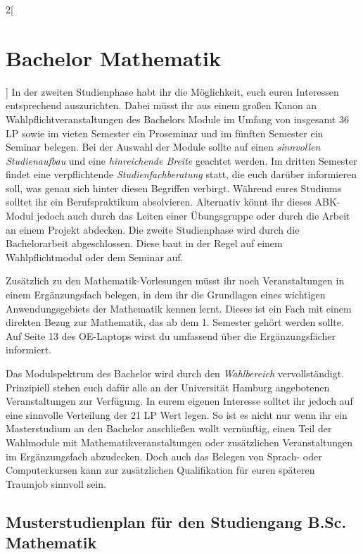 \begin{multicols}{2}[\section{Bachelor Mathematik}]
In der zweiten Studienphase habt ihr die Möglichkeit, euch euren Interessen
entsprechend auszurichten. Dabei müsst ihr aus einem großen Kanon an
Wahlpflichtveranstaltungen des Bachelors Module im Umfang von insgesamt 36 LP
sowie im vieten Semester ein Proseminar und im fünften Semester ein Seminar
belegen. Bei der Auswahl der Module sollte auf einen \emph{sinnvollen
Studienaufbau} und eine \emph{hinreichende Breite} geachtet werden.  Im dritten
Semester findet eine verpflichtende \emph{Studienfachberatung} statt, die euch
darüber informieren soll, was genau sich hinter diesen Begriffen verbirgt.
Während eures Studiums solltet ihr ein Berufspraktikum absolvieren. Alternativ
könnt ihr dieses ABK-Modul jedoch auch durch das Leiten einer Übungsgruppe oder
durch die Arbeit an einem Projekt abdecken.  Die zweite Studienphase wird durch
die Bachelorarbeit abgeschlossen. Diese baut in der Regel auf einem
Wahlpflichtmodul oder dem Seminar auf.

Zusätzlich zu den Mathematik-Vorlesungen müsst ihr noch Veranstaltungen in
einem Ergänzungsfach belegen, in dem ihr die Grundlagen eines wichtigen
Anwendungsgebiets der Mathematik kennen lernt. Dieses ist ein Fach mit einem
direkten Bezug zur Mathematik, das ab dem 1. Semester gehört werden sollte. Auf
Seite 13 des OE-Laptops wirst du umfassend über die Ergänzungsfächer
informiert.

Das Modulspektrum des Bachelor wird durch den \emph{Wahlbereich}
vervollständigt. Prinzipiell stehen euch dafür alle an der Universität Hamburg
angebotenen Veranstaltungen zur Verfügung.  In eurem eigenen Interesse solltet
ihr jedoch auf eine sinnvolle Verteilung der 21 LP Wert legen. So ist es nicht
nur wenn ihr ein Masterstudium an den Bachelor anschließen wollt vernünftig,
einen Teil der Wahlmodule mit Mathematikveranstaltungen oder zusätzlichen
Veranstaltungen im Ergänzungsfach abzudecken.  Doch auch das Belegen von
Sprach- oder Computerkursen kann zur zusätzlichen Qualifikation für euren
späteren Traumjob sinnvoll sein.
\end{multicols}
\clearpage

\subsection{Musterstudienplan für den Studiengang B.Sc. Mathematik}

